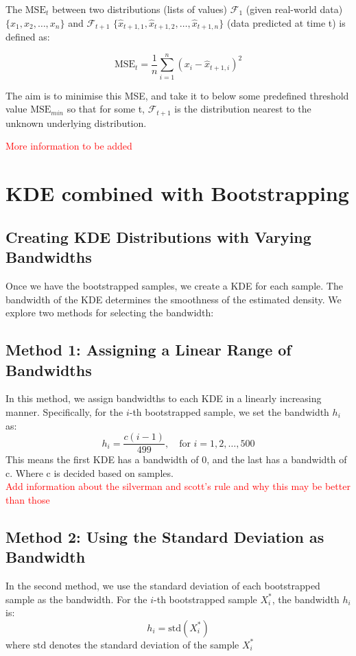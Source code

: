 \documentclass[conference]{IEEEtran}
\begin{document}
The $\text{MSE}_{t}$ between two distributions (lists of values) $\mathcal{F}_{1}$ (given real-world data) \( \{x_1, x_2, \ldots, x_n\} \) and $\mathcal{F}_{t+1}$ \( \{\hat{x}_{t+1,1}, \hat{x}_{t+1,2}, \ldots, \hat{x}_{t+1,n}\} \) (data predicted at time t) is defined as:

\begin{subequations}
    \begin{equation}
    \text{MSE}_{t} = \frac{1}{n} \sum_{i=1}^{n} (x_i - \hat{x}_{t+1, i})^2
    \end{equation}
\end{subequations}

The aim is to minimise this MSE, and take it to below some predefined threshold value $\text{MSE}_{min}$ so that for some t, $\mathcal{F}_{t+1}$ is the distribution nearest to the unknown underlying distribution. 

\textcolor{red}{More information to be added } 


\section{KDE combined with Bootstrapping}


\subsection{Creating KDE Distributions with Varying Bandwidths}
Once we have the bootstrapped samples, we create a KDE for each sample. The bandwidth of the KDE determines the smoothness of the estimated density. We explore two methods for selecting the bandwidth:

\subsection{Method 1: Assigning a Linear Range of Bandwidths}
In this method, we assign bandwidths to each KDE in a linearly increasing manner. Specifically, for the \( i \)-th bootstrapped sample, we set the bandwidth \( h_i \) as:
\[
h_i = \frac{c(i - 1)}{499}, \quad \text{for } i = 1, 2, \ldots, 500
\]
This means the first KDE has a bandwidth of 0, and the last has a bandwidth of c. Where c is decided based on samples. \\
\textcolor{red}{Add information about the silverman and scott's rule and why this may be better than those}

\subsection{Method 2: Using the Standard Deviation as Bandwidth}
In the second method, we use the standard deviation of each bootstrapped sample as the bandwidth. For the \( i \)-th bootstrapped sample \( X_i^* \), the bandwidth \( h_i \) is:
\[
h_i = \text{std}(X_i^*)
\]
where \( \text{std} \) denotes the standard deviation of the sample \(X_i^*\)
\end{document}

